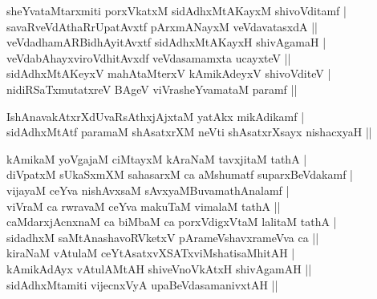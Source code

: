 \begin{entry}
\smallskip
\begin{shl}
sheYvataMtarxmiti porxVkatxM sidAdhxMtAKayxM shivoVditamf |\\
savaRveVdAthaRrUpatAvxtf pArxmANayxM veVdavatasxdA ||\\
veVdadhamARBidhAyitAvxtf sidAdhxMtAKayxH shivAgamaH |\\
veVdabAhayxviroVdhitAvxdf veVdasamamxta ucayxteV ||\\
sidAdhxMtAKeyxV mahAtaMterxV kAmikAdeyxV shivoVditeV |\\
nidiRSaTxmutatxreV BAgeV viVrasheYvamataM paramf ||
\end{shl}
\smallskip
{}
\smallskip
{}
\smallskip
\begin{shl}
IshAnavakAtxrXdUvaRsAthxjAjxtaM yatAkx mikAdikamf |\\
sidAdhxMtAtf paramaM shAsatxrXM neVti shAsatxrXsayx nishacxyaH ||
\end{shl}
\smallskip
{}
\smallskip
\begin{shl}
kAmikaM yoVgajaM ciMtayxM kAraNaM tavxjitaM tathA |\\
diVpatxM sUkaSxmXM sahasarxM ca aMshumatf suparxBeVdakamf |\\
vijayaM ceYva nishAvxsaM sAvxyaMBuvamathAnalamf |\\
viVraM ca rwravaM ceYva makuTaM vimalaM tathA ||\\
caMdarxjAcnxnaM ca biMbaM ca porxVdigxVtaM lalitaM tathA |\\
sidadhxM saMtAnashavoRVketxV pArameVshavxrameVva ca ||\\
kiraNaM vAtulaM ceYtAsatxvXSATxviMshatisaMhitAH |\\
kAmikAdAyx vAtulAMtAH shiveVnoVkAtxH shivAgamAH ||\\
sidAdhxMtamiti vijecnxVyA upaBeVdasamanivxtAH ||
\end{shl}
\smallskip
{}
\smallskip
{}
\end{entry}
